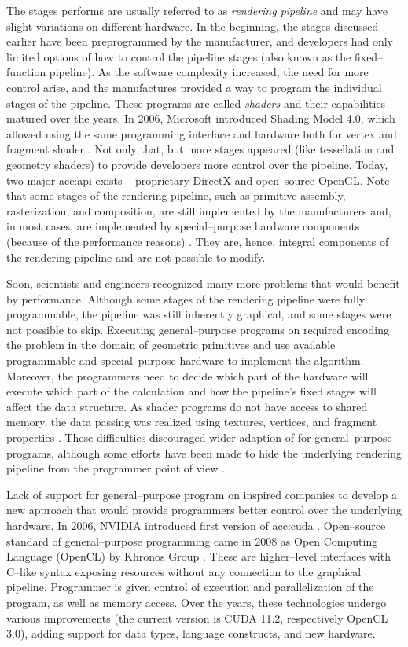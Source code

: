 The stages \gpu performs are usually referred to as \emph{rendering pipeline} and may have slight variations on different hardware. In the beginning, the stages discussed earlier have been preprogrammed by the manufacturer, and developers had only limited options of how to control the pipeline stages (also known as the fixed--function pipeline). As the software complexity increased, the need for more control arise, and the manufactures provided a way to program the individual stages of the pipeline. These programs are called \emph{shaders} and their capabilities matured over the years. In 2006, Microsoft introduced Shading Model 4.0, which allowed using the same programming interface and hardware both for vertex and fragment shader \citep{DirectX10}. Not only that, but more stages appeared (like tessellation and geometry shaders) to provide developers more control over the pipeline. Today, two major \acrfull{acc:api} exists -- proprietary  DirectX and open--source OpenGL. Note that some stages of the rendering pipeline, such as primitive assembly, rasterization, and composition, are still implemented by the \gpu manufacturers and, in most cases, are implemented by special--purpose hardware components (because of the performance reasons) \citep{SoftwareRasterization}. They are, hence, integral components of the rendering pipeline and are not possible to modify.

Soon, scientists and engineers recognized many more problems that would benefit by \gpu performance. Although some stages of the rendering pipeline were fully programmable, the pipeline was still inherently graphical, and some stages were not possible to skip. Executing general--purpose programs on \gpu required encoding the problem in the domain of geometric primitives and use available programmable and special--purpose hardware to implement the algorithm. Moreover, the programmers need to decide which part of the hardware will execute which part of the calculation and how the pipeline's fixed stages will affect the data structure. As shader programs do not have access to shared memory, the data passing was realized using textures, vertices, and fragment properties \citep{GPUComputingOwens}. These difficulties discouraged wider adaption of \gpu for general--purpose programs, although some efforts have been made to hide the underlying rendering pipeline from the programmer point of view \citep{BrookGPU}.

Lack of support for general--purpose program on \gpu inspired companies to develop a new approach that would provide programmers better control over the underlying hardware. In 2006, NVIDIA introduced first version of \acrfull{acc:cuda} \citep{CUDAwiki}. Open--source standard of general--purpose \gpu programming came in 2008 as Open Computing Language (OpenCL) by Khronos Group \citep{OpenCLRelease}. These are higher--level interfaces with C--like syntax exposing \gpu resources without any connection to the graphical pipeline. Programmer is given control of execution and parallelization of the program, as well as memory access. Over the years, these technologies undergo various improvements (the current version is CUDA 11.2, respectively OpenCL 3.0), adding support for data types, language constructs, and new hardware.

